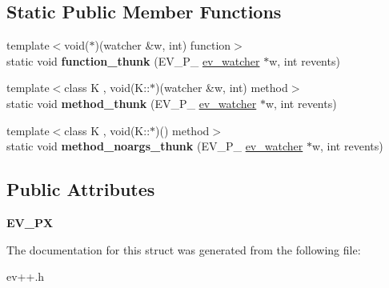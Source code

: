 \subsection*{Static Public Member Functions}
\begin{DoxyCompactItemize}
\item 
\hypertarget{structev_1_1base_af92ff4c3ec97e0c58ed6e31ebda29f06}{}\label{structev_1_1base_af92ff4c3ec97e0c58ed6e31ebda29f06} 
{\footnotesize template$<$void($\ast$)(watcher \&w, int) function$>$ }\\static void {\bfseries function\+\_\+thunk} (E\+V\+\_\+\+P\+\_\+ \hyperlink{structev__watcher}{ev\+\_\+watcher} $\ast$w, int revents)
\item 
\hypertarget{structev_1_1base_a92dcb320feed5317236bf538ad5b271d}{}\label{structev_1_1base_a92dcb320feed5317236bf538ad5b271d} 
{\footnotesize template$<$class K , void(\+K\+::$\ast$)(watcher \&w, int) method$>$ }\\static void {\bfseries method\+\_\+thunk} (E\+V\+\_\+\+P\+\_\+ \hyperlink{structev__watcher}{ev\+\_\+watcher} $\ast$w, int revents)
\item 
\hypertarget{structev_1_1base_a50317e6868452f61444c9e2c79ae8aae}{}\label{structev_1_1base_a50317e6868452f61444c9e2c79ae8aae} 
{\footnotesize template$<$class K , void(\+K\+::$\ast$)() method$>$ }\\static void {\bfseries method\+\_\+noargs\+\_\+thunk} (E\+V\+\_\+\+P\+\_\+ \hyperlink{structev__watcher}{ev\+\_\+watcher} $\ast$w, int revents)
\end{DoxyCompactItemize}
\subsection*{Public Attributes}
\begin{DoxyCompactItemize}
\item 
\hypertarget{structev_1_1base_a816642e2a857014212eae34d9696abda}{}\label{structev_1_1base_a816642e2a857014212eae34d9696abda} 
{\bfseries E\+V\+\_\+\+PX}
\end{DoxyCompactItemize}


The documentation for this struct was generated from the following file\+:\begin{DoxyCompactItemize}
\item 
ev++.\+h\end{DoxyCompactItemize}
